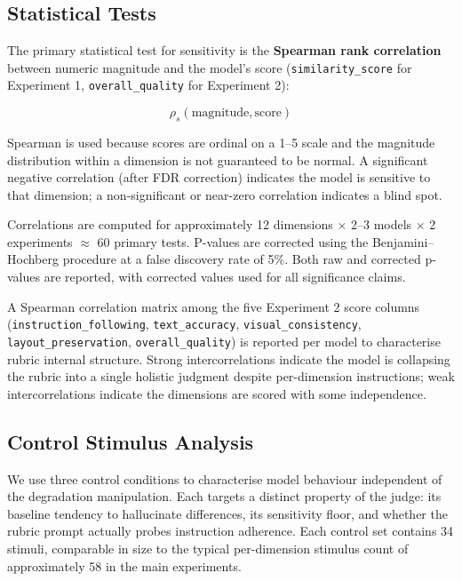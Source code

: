 \subsection{Statistical Tests} \label{Statistical Tests}

The primary statistical test for sensitivity is the \textbf{Spearman rank correlation} between numeric magnitude and the model's score (\texttt{similarity\_score} for Experiment 1, \texttt{overall\_quality} for Experiment 2):

\[\rho_s(\text{magnitude}, \text{score})\]

Spearman is used because scores are ordinal on a 1--5 scale and the magnitude distribution within a dimension is not guaranteed to be normal. A significant negative correlation (after FDR correction) indicates the model is sensitive to that dimension; a non-significant or near-zero correlation indicates a blind spot.

Correlations are computed for approximately 12 dimensions $\times$ 2--3 models $\times$ 2 experiments $\approx$ 60 primary tests. P-values are corrected using the Benjamini--Hochberg procedure at a false discovery rate of 5\%. Both raw and corrected p-values are reported, with corrected values used for all significance claims.

A Spearman correlation matrix among the five Experiment 2 score columns (\texttt{instruction\_following}, \texttt{text\_accuracy}, \texttt{visual\_consistency}, \texttt{layout\_preservation}, \texttt{overall\_quality}) is reported per model to characterise rubric internal structure. Strong intercorrelations indicate the model is collapsing the rubric into a single holistic judgment despite per-dimension instructions; weak intercorrelations indicate the dimensions are scored with some independence.

\subsection{Control Stimulus Analysis} \label{Control Stimulus Analysis}

We use three control conditions to characterise model behaviour independent of the degradation manipulation. Each targets a distinct property of the judge: its baseline tendency to hallucinate differences, its sensitivity floor, and whether the rubric prompt actually probes instruction adherence. Each control set contains 34 stimuli, comparable in size to the typical per-dimension stimulus count of approximately 58 in the main experiments.

